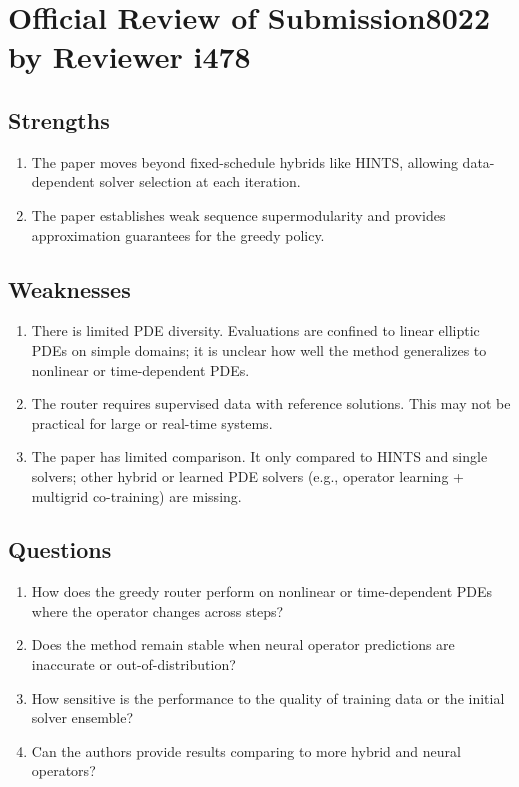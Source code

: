 \documentclass[12pt]{article}
\begin{document}
\section{Official Review of Submission8022 by Reviewer i478}

\subsection*{Strengths}
\begin{enumerate}
    \item The paper moves beyond fixed-schedule hybrids like HINTS, allowing data-dependent solver selection at each iteration.
    \item The paper establishes weak sequence supermodularity and provides approximation guarantees for the greedy policy.
\end{enumerate}


\subsection*{Weaknesses}

\begin{enumerate}
    \item There is limited PDE diversity. Evaluations are confined to linear elliptic PDEs on simple domains; it is unclear how well the method generalizes to nonlinear or time-dependent PDEs.
    \item The router requires supervised data with reference solutions. This may not be practical for large or real-time systems.
    \item The paper has limited comparison. It only compared to HINTS and single solvers; other hybrid or learned PDE solvers (e.g., operator learning + multigrid co-training) are missing.
\end{enumerate}

\subsection*{Questions}

\begin{enumerate}
    \item How does the greedy router perform on nonlinear or time-dependent PDEs where the operator changes across steps?
    \item Does the method remain stable when neural operator predictions are inaccurate or out-of-distribution?
    \item How sensitive is the performance to the quality of training data or the initial solver ensemble?
    \item Can the authors provide results comparing to more hybrid and neural operators?
\end{enumerate}
\end{document}

